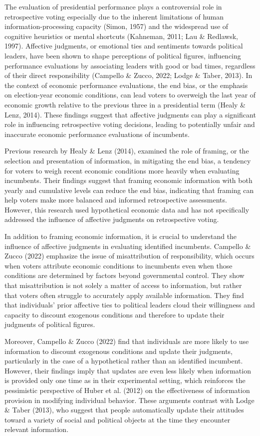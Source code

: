 \documentclass[
]{article}
\begin{document}
The evaluation of presidential performance plays a controversial role in
retrospective voting especially due to the inherent limitations of human
information-processing capacity (Simon, 1957) and the widespread use of
cognitive heuristics or mental shortcuts (Kahneman, 2011; Lau \&
Redlawsk, 1997). Affective judgments, or emotional ties and sentiments
towards political leaders, have been shown to shape perceptions of
political figures, influencing performance evaluations by associating
leaders with good or bad times, regardless of their direct
responsibility (Campello \& Zucco, 2022; Lodge \& Taber, 2013). In the
context of economic performance evaluations, the end bias, or the
emphasis on election-year economic conditions, can lead voters to
overweigh the last year of economic growth relative to the previous
three in a presidential term (Healy \& Lenz, 2014). These findings
suggest that affective judgments can play a significant role in
influencing retrospective voting decisions, leading to potentially
unfair and inaccurate economic performance evaluations of incumbents.

Previous research by Healy \& Lenz (2014), examined the role of framing,
or the selection and presentation of information, in mitigating the end
bias, a tendency for voters to weigh recent economic conditions more
heavily when evaluating incumbents. Their findings suggest that framing
economic information with both yearly and cumulative levels can reduce
the end bias, indicating that framing can help voters make more balanced
and informed retrospective assessments. However, this research used
hypothetical economic data and has not specifically addressed the
influence of affective judgments on retrospective voting.

In addition to framing economic information, it is crucial to understand
the influence of affective judgments in evaluating identified
incumbents. Campello \& Zucco (2022) emphasize the issue of
misattribution of responsibility, which occurs when voters attribute
economic conditions to incumbents even when those conditions are
determined by factors beyond governmental control. They show that
misattribution is not solely a matter of access to information, but
rather that voters often struggle to accurately apply available
information. They find that individuals' prior affective ties to
political leaders cloud their willingness and capacity to discount
exogenous conditions and therefore to update their judgments of
political figures.

Moreover, Campello \& Zucco (2022) find that individuals are more likely
to use information to discount exogenous conditions and update their
judgments, particularly in the case of a hypothetical rather than an
identified incumbent. However, their findings imply that updates are
even less likely when information is provided only one time as in their
experimental setting, which reinforces the pessimistic perspective of
Huber et al. (2012) on the effectiveness of information provision in
modifying individual behavior. These arguments contrast with Lodge \&
Taber (2013), who suggest that people automatically update their
attitudes toward a variety of social and political objects at the time
they encounter relevant information.
\end{document}

